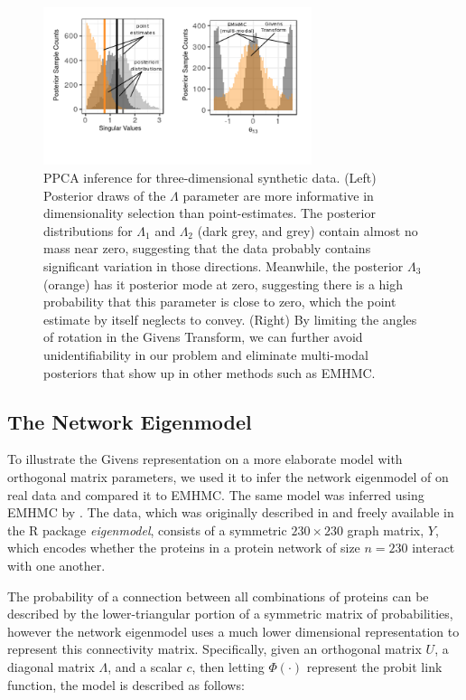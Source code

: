 \documentclass[ba]{imsart}
\numberwithin{equation}{section}
\theoremstyle{plain}
\begin{document}
\begin{figure}[h]
\centering
\vspace{.1in}
\includegraphics[width=0.7\textwidth]{figures/ppca_posterior_new.png}
\vspace{.05in}
\caption{PPCA inference for three-dimensional synthetic data. (Left) Posterior draws of the $\Lambda$ parameter are more informative in dimensionality selection than point-estimates. The posterior distributions for $\Lambda_1$ and $\Lambda_2$ (dark grey, and grey) contain almost no mass near zero, suggesting that the data probably contains significant variation in those directions. Meanwhile, the posterior $\Lambda_3$ (orange) has it posterior mode at zero, suggesting there is a high probability that this parameter is close to zero, which the point estimate by itself neglects to convey. (Right) By limiting the angles of rotation in the Givens Transform, we can further avoid unidentifiability in our problem and eliminate multi-modal posteriors that show up in other methods such as EMHMC.}
\label{fig:ppca_posterior}
\end{figure}

\subsection{The Network Eigenmodel}
To illustrate the Givens representation on a more elaborate model with orthogonal matrix parameters, we used it to infer the network eigenmodel of \cite{hoff2009simulation} on real data and compared it to EMHMC. The same model was inferred using EMHMC by \cite{byrne2013geodesic}. The data, which was originally described in \cite{butland2005interaction} and freely available in the R package \textit{eigenmodel}, consists of a symmetric $230 \times 230$ graph matrix, $Y$, which encodes whether the proteins in a protein network of size $n=230$ interact with one another.

\noindent The probability of a connection between all combinations of proteins can be described by the lower-triangular portion of a symmetric matrix of probabilities, however the network eigenmodel uses a much lower dimensional representation to represent this connectivity matrix. Specifically, given an orthogonal matrix $U$, a diagonal matrix $\Lambda$, and a scalar $c$, then letting $\Phi(\cdot)$ represent the probit link function, the model is described as follows:
\end{document}
